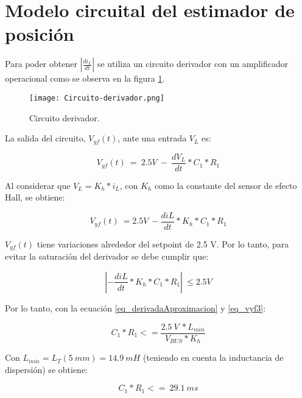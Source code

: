\section{Modelo circuital del estimador de posici\'{o}n}

\noindent Para poder obtener $\left|\frac{{di}_L}{dt}\right|$ se utiliza un circuito derivador con un amplificador operacional como se observa en la figura  \ref{fig:img_Circuito-derivador}.

\begin{figure}[H]
	\centering
	\texttt{[image: Circuito-derivador.png]}
	\caption{Circuito derivador.}
	\label{fig:img_Circuito-derivador}
\end{figure}

\noindent La salida del circuito, $V_{yf}(t)$, ante una entrada $V_L$ es:

\begin{equation} \label{eq_vyf1}
	V_{yf}(t)\ =\ 2.5V\ -\ \frac{dV_L}{dt}*C_1*R_1
\end{equation}


\noindent Al considerar que $V_L=K_h*i_L$, con $K_h$ como la constante del sensor de efecto Hall, se obtiene: 

\begin{equation} \label{eq_vyf2}
	V_{yf}(t)\ =2.5V\ -\frac{diL}{dt}*K_h*C_1*R_1
\end{equation}

\noindent $V_{yf}(t)$ tiene variaciones alrededor del setpoint de 2.5 V. Por lo tanto, para evitar la saturaci\'{o}n del derivador se debe cumplir que:

\begin{equation} \label{eq_vyf3}
	\left|-\frac{diL}{dt}*K_h*C_1*R_1\right|\ \le 2.5V
\end{equation}

\noindent Por lo tanto, con la ecuaci\'{o}n \ref{eq_derivadaAproximacion} y \ref{eq_vyf3}:

\begin{equation} \label{eq_condicionC1-R1}
	C_1*R_1<=\frac{2.5\ V\ *L_{min}}{V_{BUS}*K_h}
\end{equation}

\noindent Con $L_{min}= L_T(5\: mm)= 14.9\: mH$ (teniendo en cuenta la inductancia de dispersi\'{o}n) se obtiene: 

\begin{equation} \label{eq_condicionC1-R1-2}
	C_1*R_1<=\ 29.1\ ms
\end{equation}


